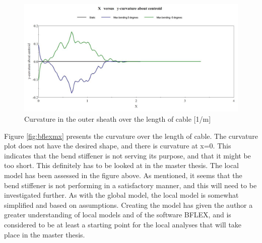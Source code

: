 \begin{figure}[H]
\centering
\includegraphics[scale=0.75]{figures/bflexcurve}
\caption[$\; \:$Curvature in outer sheath]{Curvature in the outer sheath over the length of cable [1/m]}
 \label{fig:bflexmz}
\end{figure}
\noindent Figure \ref{fig:bflexmx} presents the curvature over the length of cable. The curvature plot does not have the desired shape, and there is curvature at x=0. This indicates that the bend stiffener is not serving its purpose, and that it might be too short. This definitely has to be looked at in the master thesis. \newline
\newline
The local model has been assessed in the figure above. As mentioned, it seems that the bend stiffener is not performing in a satisfactory manner, and this will need to be investigated further. As with the global model, the local model is somewhat simplified and based on assumptions. Creating the model has given the author a greater understanding of local models and of the software BFLEX, and is considered to be at least a starting point for the local analyses that will take place in the master thesis.   